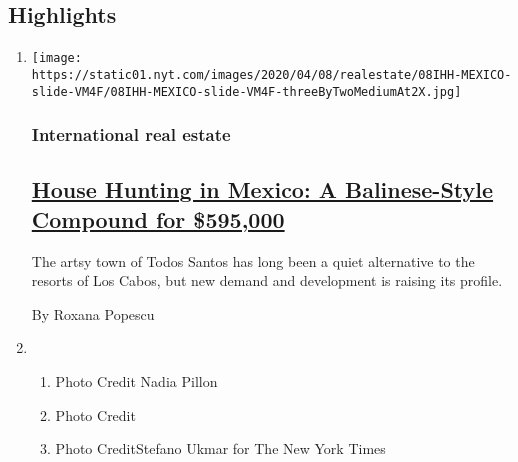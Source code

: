 \hypertarget{highlights}{%
\subsection{Highlights}\label{highlights}}

\begin{enumerate}
\def\labelenumi{\arabic{enumi}.}
\item
  \texttt{[image: https://static01.nyt.com/images/2020/04/08/realestate/08IHH-MEXICO-slide-VM4F/08IHH-MEXICO-slide-VM4F-threeByTwoMediumAt2X.jpg]}

  \hypertarget{international-real-estate}{%
  \subsubsection{International real
  estate}\label{international-real-estate}}

  \hypertarget{house-hunting-in-mexico-a-balinese-style-compound-for-595000}{%
  \subsection{\texorpdfstring{\href{/2020/04/08/realestate/house-hunting-in-mexico-a-balinese-style-compound-for-595000.html}{House
  Hunting in Mexico: A Balinese-Style Compound for
  \$595,000}}{House Hunting in Mexico: A Balinese-Style Compound for \$595,000}}\label{house-hunting-in-mexico-a-balinese-style-compound-for-595000}}

  The artsy town of Todos Santos has long been a quiet alternative to
  the resorts of Los Cabos, but new demand and development is raising
  its profile.

  By Roxana Popescu
\item
  \begin{enumerate}
  \def\labelenumii{\arabic{enumii}.}
  \tightlist
  \item
    Photo Credit Nadia Pillon
  \item
    Photo Credit
  \item
    Photo CreditStefano Ukmar for The New York Times
  \end{enumerate}
\end{enumerate}

